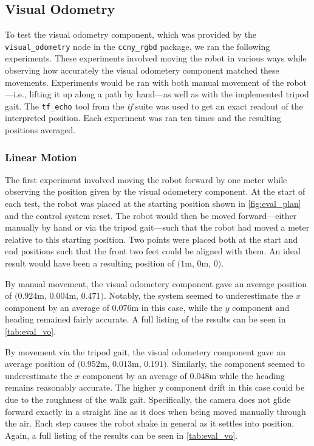 \subsection{Visual Odometry}

To test the visual odometry component, which was provided by the \texttt{visual\_odometry} node in the \texttt{ccny\_rgbd} package, we ran the following experiments. These experiments involved moving the robot in various ways while observing how accurately the visual odometery component matched these movements. Experiments would be ran with both manual movement of the robot---i.e., lifting it up along a path by hand---as well as with the implemented tripod gait. The \texttt{tf\_echo} tool from the \emph{tf} suite was used to get an exact readout of the interpreted position. Each experiment was ran ten times and the resulting positions averaged.

\subsubsection{Linear Motion}

The first experiment involved moving the robot forward by one meter while observing the position given by the visual odometery component. At the start of each test, the robot was placed at the starting position shown in \autoref{fig:eval_plan} and the control system reset. The robot would then be moved forward---either manually by hand or via the tripod gait---such that the robot had moved a meter relative to this starting position. Two points were placed both at the start and end positions such that the front two feet could be aligned with them. An ideal result would have been a resulting position of $(1$m, $0$m, $0$\textdegree{}$)$.

By manual movement, the visual odometery component gave an average position of $(0.924$m, $0.004$m, $0.471$\textdegree{}$)$. Notably, the system seemed to underestimate the $x$ component by an average of $0.076$m in this case, while the $y$ component and heading remained fairly accurate. A full listing of the results can be seen in \autoref{tab:eval_vo}.

By movement via the tripod gait, the visual odometery component gave an average position of $(0.952$m, $0.013$m, $0.191$\textdegree{}$)$. Similarly, the component seemed to underestimate the $x$ component by an average of $0.048$m while the heading remains reasonably accurate. The higher $y$ component drift in this case could be due to the roughness of the walk gait. Specifically, the camera does not glide forward exactly in a straight line as it does when being moved manually through the air. Each step causes the robot shake in general as it settles into position. Again, a full listing of the results can be seen in \autoref{tab:eval_vo}.

